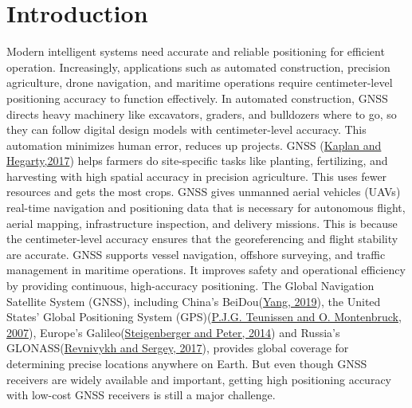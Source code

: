\documentclass{isprs} %
\begin{document}

\maketitle


\section{Introduction}\label{INTRODUCTINO}
\label{sec:introduction}
\sloppy

Modern intelligent systems need accurate and reliable positioning for efficient operation. Increasingly, applications such as automated construction, precision agriculture, drone navigation, and maritime operations require centimeter-level positioning accuracy to function effectively. In automated construction, GNSS directs heavy machinery like excavators, graders, and bulldozers where to go, so they can follow digital design models with centimeter-level accuracy. This automation minimizes human error, reduces up projects. GNSS (\hyperref[KaplanHegarty]{Kaplan and Hegarty,2017}) helps farmers do site-specific tasks like planting, fertilizing, and harvesting with high spatial accuracy in precision agriculture. This uses fewer resources and gets the most crops. GNSS gives unmanned aerial vehicles (UAVs) real-time navigation and positioning data that is necessary for autonomous flight, aerial mapping, infrastructure inspection, and delivery missions. This is because the centimeter-level accuracy ensures that the georeferencing and flight stability are accurate. GNSS supports vessel navigation, offshore surveying, and traffic management in maritime operations. It improves safety and operational efficiency by providing continuous, high-accuracy positioning. The Global Navigation Satellite System (GNSS), including China's BeiDou(\hyperref[Yang2019]{Yang, 2019}), the United States' Global Positioning System (GPS)(\hyperref[TeunissenMontenbruck]{P.J.G. Teunissen and O. Montenbruck, 2007}), Europe's Galileo(\hyperref[SteigenbergerPeter]{Steigenberger and Peter, 2014}) and Russia's GLONASS(\hyperref[RevnivykhSergey]{Revnivykh and Sergey, 2017}), provides global coverage for determining precise locations anywhere on Earth. But even though GNSS receivers are widely available and important, getting high positioning accuracy with low-cost GNSS receivers  is still a major challenge.\\
\end{document}
